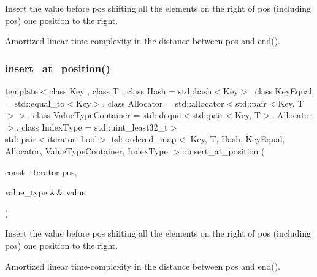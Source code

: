 Insert the value before pos shifting all the elements on the right of pos (including pos) one position to the right.

Amortized linear time-\/complexity in the distance between pos and end(). \mbox{\label{classtsl_1_1ordered__map_a9e0dd9d497c03c763f2b5776d35f9f9f}} 
\subsubsection{\texorpdfstring{insert\_at\_position()}{insert\_at\_position()}\hspace{0.1cm}{\footnotesize\ttfamily [2/2]}}
{\footnotesize\ttfamily template$<$class Key , class T , class Hash  = std\+::hash$<$\+Key$>$, class Key\+Equal  = std\+::equal\+\_\+to$<$\+Key$>$, class Allocator  = std\+::allocator$<$std\+::pair$<$\+Key, T$>$$>$, class Value\+Type\+Container  = std\+::deque$<$std\+::pair$<$\+Key, T$>$, Allocator$>$, class Index\+Type  = std\+::uint\+\_\+least32\+\_\+t$>$ \\
std\+::pair$<$iterator, bool$>$ \mbox{\hyperlink{classtsl_1_1ordered__map}{tsl\+::ordered\+\_\+map}}$<$ Key, T, Hash, Key\+Equal, Allocator, Value\+Type\+Container, Index\+Type $>$\+::insert\+\_\+at\+\_\+position (\begin{DoxyParamCaption}\item[{const\+\_\+iterator}]{pos,  }\item[{value\+\_\+type \&\&}]{value }\end{DoxyParamCaption})\hspace{0.3cm}{\ttfamily [inline]}}





Insert the value before pos shifting all the elements on the right of pos (including pos) one position to the right.

Amortized linear time-\/complexity in the distance between pos and end(). \mbox{\label{classtsl_1_1ordered__map_a6c8a42673fdc00829cde071eb1c5792d}} 

